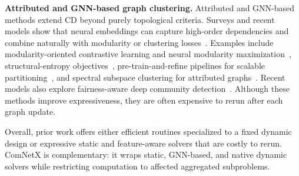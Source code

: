 \documentclass[conference]{IEEEtran}
\theoremstyle{definition}
\begin{document}
\textbf{Attributed and GNN-based graph clustering.} Attributed and GNN-based
methods extend CD beyond purely topological criteria. Surveys and recent
models show that neural embeddings can capture high-order dependencies and
combine naturally with modularity or clustering losses~\cite{CCL23,LXW26,TPP23,LYD24,ZXZ20}.
Examples include modularity-oriented contrastive learning and neural modularity
maximization~\cite{LLC24,BKH24}, structural-entropy objectives~\cite{ZPS25},
pre-train-and-refine pipelines for scalable partitioning~\cite{QZG24,QZG24HPEC},
and spectral subspace clustering for attributed graphs~\cite{LYZ25}. Recent
models also explore fairness-aware deep community detection~\cite{GPT25}.
Although these methods improve expressiveness, they are often expensive to
rerun after each graph update.

Overall, prior work offers either efficient routines specialized to a fixed
dynamic design or expressive static and feature-aware solvers that are costly to
rerun. ComNetX is complementary: it wraps static, GNN-based, and native dynamic
solvers while restricting computation to affected aggregated subproblems.
\end{document}
